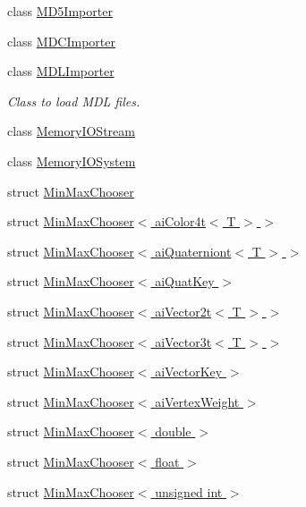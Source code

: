 \begin{DoxyCompactItemize}
class \hyperlink{class_assimp_1_1_m_d5_importer}{M\+D5\+Importer}
\item 
class \hyperlink{class_assimp_1_1_m_d_c_importer}{M\+D\+C\+Importer}
\item 
class \hyperlink{class_assimp_1_1_m_d_l_importer}{M\+D\+L\+Importer}
\begin{DoxyCompactList}\small\item\em Class to load M\+D\+L files. \end{DoxyCompactList}\item 
class \hyperlink{class_assimp_1_1_memory_i_o_stream}{Memory\+I\+O\+Stream}
\item 
class \hyperlink{class_assimp_1_1_memory_i_o_system}{Memory\+I\+O\+System}
\item 
struct \hyperlink{struct_assimp_1_1_min_max_chooser}{Min\+Max\+Chooser}
\item 
struct \hyperlink{struct_assimp_1_1_min_max_chooser_3_01ai_color4t_3_01_t_01_4_01_4}{Min\+Max\+Chooser$<$ ai\+Color4t$<$ T $>$ $>$}
\item 
struct \hyperlink{struct_assimp_1_1_min_max_chooser_3_01ai_quaterniont_3_01_t_01_4_01_4}{Min\+Max\+Chooser$<$ ai\+Quaterniont$<$ T $>$ $>$}
\item 
struct \hyperlink{struct_assimp_1_1_min_max_chooser_3_01ai_quat_key_01_4}{Min\+Max\+Chooser$<$ ai\+Quat\+Key $>$}
\item 
struct \hyperlink{struct_assimp_1_1_min_max_chooser_3_01ai_vector2t_3_01_t_01_4_01_4}{Min\+Max\+Chooser$<$ ai\+Vector2t$<$ T $>$ $>$}
\item 
struct \hyperlink{struct_assimp_1_1_min_max_chooser_3_01ai_vector3t_3_01_t_01_4_01_4}{Min\+Max\+Chooser$<$ ai\+Vector3t$<$ T $>$ $>$}
\item 
struct \hyperlink{struct_assimp_1_1_min_max_chooser_3_01ai_vector_key_01_4}{Min\+Max\+Chooser$<$ ai\+Vector\+Key $>$}
\item 
struct \hyperlink{struct_assimp_1_1_min_max_chooser_3_01ai_vertex_weight_01_4}{Min\+Max\+Chooser$<$ ai\+Vertex\+Weight $>$}
\item 
struct \hyperlink{struct_assimp_1_1_min_max_chooser_3_01double_01_4}{Min\+Max\+Chooser$<$ double $>$}
\item 
struct \hyperlink{struct_assimp_1_1_min_max_chooser_3_01float_01_4}{Min\+Max\+Chooser$<$ float $>$}
\item 
struct \hyperlink{struct_assimp_1_1_min_max_chooser_3_01unsigned_01int_01_4}{Min\+Max\+Chooser$<$ unsigned int $>$}
\item 

\end{DoxyCompactItemize}
